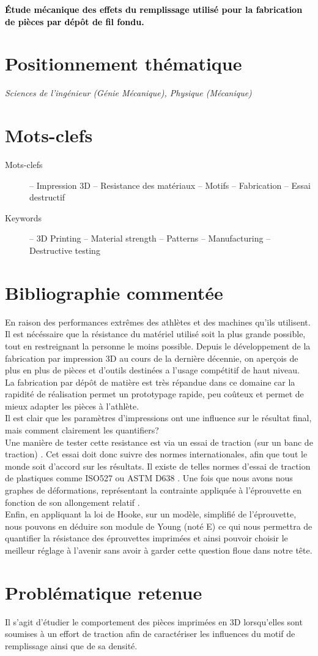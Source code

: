 \documentclass[12pt, french]{article}
\newcommand{\motclefs}[2]{
\section*{Mots-clefs}
\begin{description}
\item[Mots-clefs] -- #1 
\item[Keywords]   -- #2
\end{description}
}
\newcommand{\positionnementThematique}[1]{
\section*{Positionnement thématique}
{\it #1}}
\newcommand{\Titre}[1]{
\noindent
\textcolor{black}{\Huge\textbf{\textsf{#1}}}
\vspace*{0.75cm}
}
\begin{document}
\Titre{Étude mécanique des effets du remplissage utilisé pour la fabrication de pièces par dépôt de fil fondu.}

\positionnementThematique{Sciences de l'ingénieur (Génie Mécanique), Physique (Mécanique)}

\motclefs{Impression 3D -- Resistance des matériaux -- Motifs -- Fabrication -- Essai destructif}{3D Printing -- Material strength -- Patterns -- Manufacturing -- Destructive testing}

\section*{Bibliographie commentée}
En raison des performances extrêmes des athlètes et des machines qu'ils utilisent. Il est nécéssaire que la résistance du matériel utilisé soit la plus grande possible, tout en restreignant la personne le moins possible. Depuis le développement de la fabrication par impression 3D au cours de la dernière décennie, on aperçois de plus en plus de pièces et d'outils destinées a l'usage compétitif de haut niveau. \cite{sports}
\noindent \\
 La fabrication par dépôt de matière est très répandue dans ce domaine car la rapidité de réalisation permet un prototypage rapide, peu coûteux \cite{miami} et permet de mieux adapter les pièces à l'athlète.\cite{sports}\\
 Il est clair que les paramètres d'impressions ont une influence sur le résultat final, mais comment clairement les quantifiers?\\
 
Une manière de tester cette resistance est via un essai de traction (sur un banc de traction) \cite{tensiletestd638}. Cet essai doit donc suivre des normes internationales, afin que tout le monde soit d'accord sur les résultats. Il existe de telles normes d'essai de traction de plastiques comme ISO527 ou ASTM D638 \cite{ASTMD638}. Une fois que nous avons nous graphes de déformations, représentant la contrainte appliquée à l'éprouvette en fonction de son allongement relatif \cite{infill}.\\
Enfin, en appliquant la loi de Hooke, sur un modèle, simplifié de l'éprouvette, nous pouvons en déduire son module de Young (noté E) \cite{rdm} ce qui nous permettra de quantifier la résistance des éprouvettes imprimées et ainsi pouvoir choisir le meilleur réglage à l'avenir sans avoir à garder cette question floue dans notre tête.


\section*{Problématique retenue}
Il s’agit d’étudier le comportement des pièces imprimées en 3D lorsqu’elles sont soumises à un effort de traction afin de caractériser les influences du motif de remplissage ainsi que de sa densité.
\end{document}
